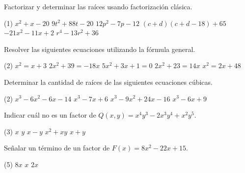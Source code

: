 \begin{multicols}{2}

    \begin{exercise}
        Factorizar y determinar las raíces usando factorización clásica.
        \begin{tasks}(1)
            \task $x^2 + x - 20$
            \task $9t^2 + 88t - 20$
            \task $12p^2 - 7p - 12$
            \task $(c + d)(c + d - 18) + 65$
            \task $-21x^2 - 11x + 2$
            \task $r^4 - 13r^2 + 36$
        \end{tasks}
    \end{exercise}

    \begin{exercise}
        Resolver las siguientes ecuaciones utilizando la fórmula general.
        \begin{tasks}(2)
            \task $x^2 = x + 3$
            \task $2x^2 + 39 = -18x$
            \task $5x^2 + 3x + 1 = 0$
            \task $2x^2 + 23 = 14x$
            \task $x^2 = 2x + 48$
        \end{tasks}
    \end{exercise}

    \begin{exercise}
        Determinar la cantidad de raíces de las siguientes ecuaciones cúbicas.
        \begin{tasks}(2)
            \task $x^3 - 6x^2 - 6x - 14$
            \task $x^3 - 7x + 6$
            \task $x^3 - 9x^2 + 24x - 16$
            \task $x^3 - 6x + 9$
        \end{tasks}
    \end{exercise}

    \begin{exercise}
        Indicar cuál no es un factor de $Q(x, y) = x^4 y^3 - 2x^3 y^4 + x^2 y^5$.
        \begin{tasks}(3)
            \task $x$
            \task $y$
            \task $x - y$
            \task $x^2 + xy$
            \task $x + y$
        \end{tasks}
    \end{exercise}

    \begin{exercise}
        Señalar un término de un factor de $F(x) = 8x^2 - 22x + 15$.
        \begin{tasks}(5)
            \task $8x$
            \task $x$
            \task $2x$
        \end{tasks}
    \end{exercise}


\end{multicols}

